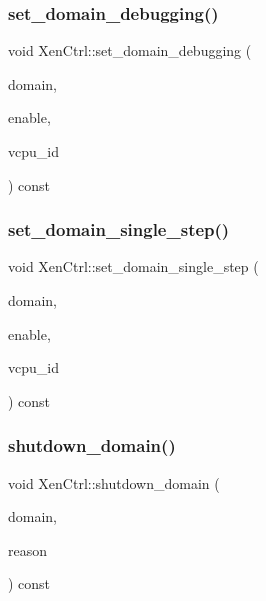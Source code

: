 \subsubsection{\texorpdfstring{set\+\_\+domain\+\_\+debugging()}{set\_domain\_debugging()}}
{\footnotesize\ttfamily void Xen\+Ctrl\+::set\+\_\+domain\+\_\+debugging (\begin{DoxyParamCaption}\item[{const \mbox{\hyperlink{classxd_1_1xen_1_1_domain}{Domain}} \&}]{domain,  }\item[{bool}]{enable,  }\item[{\mbox{\hyperlink{namespacexd_1_1xen_ac71045dda8a7d9d6fd0d7643001bb14e}{V\+C\+P\+U\+\_\+\+ID}}}]{vcpu\+\_\+id }\end{DoxyParamCaption}) const}

\mbox{\label{classxd_1_1xen_1_1_xen_ctrl_ab1df8547401e88fbf5bc9ce01889214a}} 
\subsubsection{\texorpdfstring{set\+\_\+domain\+\_\+single\+\_\+step()}{set\_domain\_single\_step()}}
{\footnotesize\ttfamily void Xen\+Ctrl\+::set\+\_\+domain\+\_\+single\+\_\+step (\begin{DoxyParamCaption}\item[{const \mbox{\hyperlink{classxd_1_1xen_1_1_domain}{Domain}} \&}]{domain,  }\item[{bool}]{enable,  }\item[{\mbox{\hyperlink{namespacexd_1_1xen_ac71045dda8a7d9d6fd0d7643001bb14e}{V\+C\+P\+U\+\_\+\+ID}}}]{vcpu\+\_\+id }\end{DoxyParamCaption}) const}

\mbox{\label{classxd_1_1xen_1_1_xen_ctrl_a687dbe8f330e23c8b36b540733989626}} 
\subsubsection{\texorpdfstring{shutdown\+\_\+domain()}{shutdown\_domain()}}
{\footnotesize\ttfamily void Xen\+Ctrl\+::shutdown\+\_\+domain (\begin{DoxyParamCaption}\item[{const \mbox{\hyperlink{classxd_1_1xen_1_1_domain}{Domain}} \&}]{domain,  }\item[{int}]{reason }\end{DoxyParamCaption}) const}

